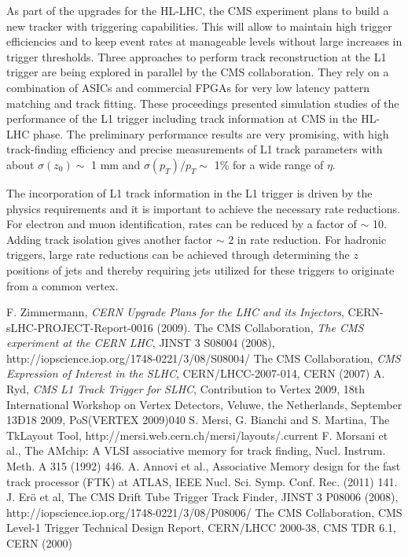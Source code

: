 \documentclass{PoS}
\begin{document}
As part of the upgrades for the HL-LHC, the CMS experiment plans to build a new tracker with triggering capabilities. This will allow to maintain high trigger efficiencies and to keep event rates at manageable levels without large increases in trigger thresholds. Three approaches to perform track reconstruction at the L1 trigger are being explored in parallel by the CMS collaboration. They rely on a combination of ASICs and commercial FPGAs for very low latency pattern matching and track fitting. These proceedings presented simulation studies of the performance of the L1 trigger including track information at CMS in the HL-LHC phase. The preliminary performance results are very promising, with high track-finding efficiency and precise measurements of L1 track parameters with about $\sigma(z_0)\sim$ 1 mm and $\sigma(p_T)/p_T \sim$ 1\% for a wide range of $\eta$.

The incorporation of L1 track information in the L1 trigger is driven by the physics requirements and it is important to achieve the necessary rate reductions. For electron and muon identification, rates can be reduced by a factor of $\sim$ 10. Adding track isolation gives another factor $\sim$ 2 in rate reduction. For hadronic triggers, large rate reductions can be achieved through determining the $z$ positions of jets and thereby requiring jets utilized for these triggers to originate from a common vertex.


\begin{thebibliography}{99}
 F. Zimmermann, \emph{CERN Upgrade Plans for the LHC and its Injectors}, CERN-sLHC-PROJECT-Report-0016 (2009).
 The CMS Collaboration, \emph{The CMS experiment at the CERN LHC}, JINST 3 S08004 (2008), http://iopscience.iop.org/1748-0221/3/08/S08004/
 The CMS Collaboration, \emph{CMS Expression of Interest in the SLHC}, CERN/LHCC-2007-014, CERN (2007)
 A. Ryd, \emph{CMS L1 Track Trigger for SLHC}, Contribution to Vertex 2009, 18th International Workshop on Vertex Detectors, Veluwe, the Netherlands, September 13Ð18 2009, PoS(VERTEX 2009)040
 S. Mersi, G. Bianchi and S. Martina, The TkLayout Tool, http://mersi.web.cern.ch/mersi/layouts/.current
 F. Morsani et al., The AMchip: A VLSI associative memory for track finding, Nucl. Instrum. Meth. A 315 (1992) 446.
 A. Annovi et al., Associative Memory design for the fast track processor (FTK) at ATLAS, IEEE Nucl. Sci. Symp. Conf. Rec. (2011) 141.
 J. Erö et al, The CMS Drift Tube Trigger Track Finder, JINST 3 P08006 (2008), http://iopscience.iop.org/1748-0221/3/08/P08006/
 The CMS Collaboration, CMS Level-1 Trigger Technical Design Report, CERN/LHCC 2000-38, CMS TDR 6.1, CERN (2000)
\end{thebibliography}
\end{document}
